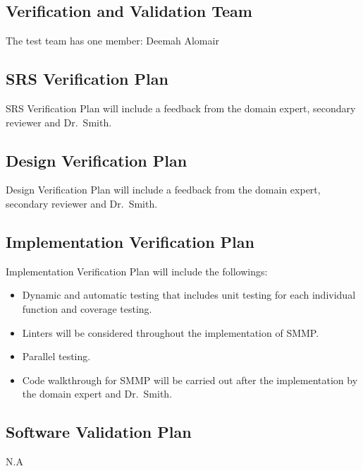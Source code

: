 \documentclass[12pt, titlepage]{article}
\begin{document}
\subsection{Verification and Validation Team}

The test team has one member: Deemah Alomair


\subsection{SRS Verification Plan}

SRS Verification Plan will include a feedback from the domain expert, secondary
reviewer and Dr.\ Smith.


\subsection{Design Verification Plan}

Design Verification Plan will include a feedback from the domain expert,
secondary reviewer and Dr.\ Smith.

\subsection{Implementation Verification Plan}

Implementation Verification Plan will include the followings:
\begin{itemize}
\item Dynamic and automatic testing that includes unit testing for each
individual function and coverage testing. 
\item Linters will be considered throughout the implementation of
  SMMP. 
\item Parallel testing.
\item Code walkthrough for SMMP will be carried out after the implementation by
the domain expert and Dr.\ Smith. 
\end{itemize}

\subsection{Software Validation Plan} N.A 
\end{document}
